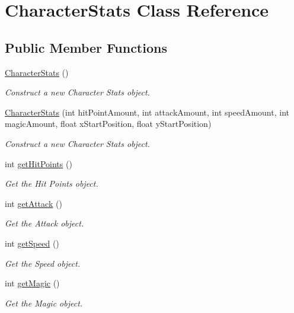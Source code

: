 \hypertarget{classCharacterStats}{}\section{Character\+Stats Class Reference}
\label{classCharacterStats}
\subsection*{Public Member Functions}
\begin{DoxyCompactItemize}
\item 
\mbox{\hyperlink{classCharacterStats_a74e13afe074c52cad1c27ea426264540}{Character\+Stats}} ()
\begin{DoxyCompactList}\small\item\em Construct a new Character Stats object. \end{DoxyCompactList}\item 
\mbox{\hyperlink{classCharacterStats_a4bb12395ec8f7eb816309e6229454e11}{Character\+Stats}} (int hit\+Point\+Amount, int attack\+Amount, int speed\+Amount, int magic\+Amount, float x\+Start\+Position, float y\+Start\+Position)
\begin{DoxyCompactList}\small\item\em Construct a new Character Stats object. \end{DoxyCompactList}\item 
int \mbox{\hyperlink{classCharacterStats_a9b22b4a1fcafe1a16f3883547eb5d9bc}{get\+Hit\+Points}} ()
\begin{DoxyCompactList}\small\item\em Get the Hit Points object. \end{DoxyCompactList}\item 
int \mbox{\hyperlink{classCharacterStats_afd13f0b95ad65a9ab7b944da61876fc1}{get\+Attack}} ()
\begin{DoxyCompactList}\small\item\em Get the Attack object. \end{DoxyCompactList}\item 
int \mbox{\hyperlink{classCharacterStats_af7dcfe803978f4a84ea87f881d857c58}{get\+Speed}} ()
\begin{DoxyCompactList}\small\item\em Get the Speed object. \end{DoxyCompactList}\item 
int \mbox{\hyperlink{classCharacterStats_a96f79ff2af072daba294d8e04f9d29a4}{get\+Magic}} ()
\begin{DoxyCompactList}\small\item\em Get the Magic object. \end{DoxyCompactList}\item 

\end{DoxyCompactItemize}
